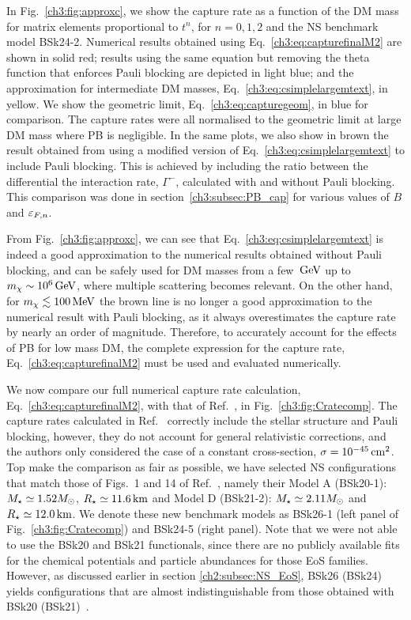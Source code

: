 In Fig.~\ref{ch3:fig:approxc}, we show the capture rate as a function of the DM mass for matrix elements proportional to $t^n$, for $n=0,1,2$ and the NS benchmark model BSk24-2. Numerical results obtained using Eq.~\ref{ch3:eq:capturefinalM2} are shown in solid red; results using the same equation but removing the theta function that enforces Pauli blocking are depicted in light blue; and the approximation for intermediate DM masses, Eq.~\ref{ch3:eq:csimplelargemtext}, in yellow. We show the geometric limit, Eq.~\ref{ch3:eq:capturegeom}, in blue for comparison. 
The capture rates were all normalised to the geometric limit at large DM mass where PB is negligible. 
In the same plots, we also show in brown the result obtained from using a modified version of Eq.~\ref{ch3:eq:csimplelargemtext} to include Pauli blocking.
This is achieved by including the ratio between the differential the interaction rate, $\Gamma^-$, calculated with and without Pauli blocking. This comparison was done in section~\ref{ch3:subsec:PB_cap} for various values of $B$ and $\varepsilon_{F,n}$.

From Fig.~\ref{ch3:fig:approxc}, we can see that Eq.~\ref{ch3:eq:csimplelargemtext} is indeed a good approximation to the numerical results obtained without Pauli blocking, and can be safely used for DM masses from a few ${\rm \,GeV}$ up to $m_\chi\sim10^6{\rm \,GeV}$, where multiple scattering becomes relevant. 
On the other hand, for $m_\chi\lesssim 100{\rm \,MeV}$ the brown line is no longer a good approximation to the numerical result with Pauli blocking, as it always overestimates the capture rate by nearly an order of magnitude. Therefore, to accurately account for the effects of PB for low mass DM, the complete expression for the capture rate, Eq.~\ref{ch3:eq:capturefinalM2} must be used and evaluated numerically.

We now compare our full numerical capture rate calculation, Eq.~\ref{ch3:eq:capturefinalM2}, with that of Ref.~\cite{Garani:2018kkd_may_NewAnalysisNeutron}, in Fig.~\ref{ch3:fig:Cratecomp}. The capture rates calculated in Ref.~\cite{Garani:2018kkd_may_NewAnalysisNeutron} correctly include the stellar structure and Pauli blocking, however, they do not account for general relativistic corrections, and the authors only considered the case of a constant cross-section, $\sigma=10^{-45}{\rm \,cm}^2$. Top make the comparison as fair as possible, we have selected NS configurations that match those of Figs.~1 and 14 of Ref.~\cite{Garani:2018kkd_may_NewAnalysisNeutron}, namely their Model A (BSk20-1):  $M_\star\simeq1.52M_\odot$, $R_\star\simeq11.6{\rm \,km}$ and Model D (BSk21-2): $M_\star\simeq2.11M_\odot$ and $R_\star\simeq12.0{\rm \,km}$. We denote these new benchmark models as BSk26-1 (left panel of Fig.~\ref{ch3:fig:Cratecomp}) and BSk24-5 (right panel). Note that we were not able to use the BSk20 and BSk21 functionals, since there are no publicly available fits for the chemical potentials and particle abundances for those EoS families. However, as discussed earlier in section \ref{ch2:subsec:NS_EoS}, BSk26 (BSk24) yields configurations that are almost indistinguishable from those obtained with BSk20 (BSk21)~\cite{Perot:2019gwl_Rolesymmetryenergy}.


